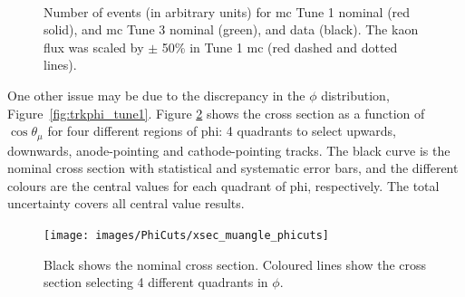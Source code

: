 \begin{figure}[t]
\centering
{} \quad
{} \\
\caption[Event Distributions with Kaon Flux Scaled]{Number of events (in arbitrary units) for \acrshort{mc} Tune 1 nominal (red solid), and \acrshort{mc} Tune 3 nominal (green), and data (black). The kaon flux was scaled by $\pm$ 50\% in Tune 1 \acrshort{mc} (red dashed and dotted lines).}
\label{fig:kaonscaled}
\end{figure}


One other issue may be due to the discrepancy in the $\phi$ distribution, Figure~\ref{fig:trkphi_tune1}. 
Figure \ref{fig:xsec_phicuts} shows the cross section as a function of $\cos\theta_\mu$ for four different regions of phi: 4 quadrants to select upwards, downwards, anode-pointing and cathode-pointing tracks. The black curve is the nominal cross section with statistical and systematic error bars, and the different colours are the central values for each quadrant of phi, respectively. The total uncertainty covers all central value results.

\begin{figure}[]
\centering
\texttt{[image: images/PhiCuts/xsec\_muangle\_phicuts]}
\caption[Cross Section in Different $\phi$ Quadrants]{Black shows the nominal cross section. Coloured lines show the cross section selecting 4 different quadrants in $\phi$.}
\label{fig:xsec_phicuts}
\end{figure}


